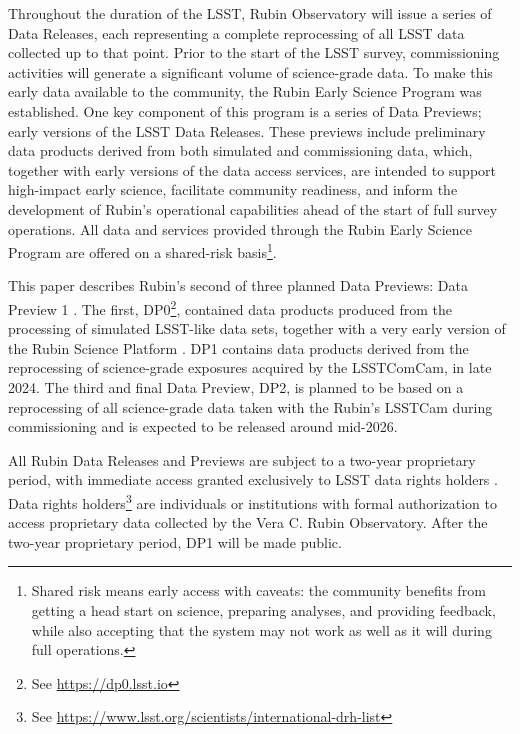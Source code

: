 Throughout the duration of the \gls{LSST},  Rubin Observatory will issue a series of Data Releases, each representing a complete reprocessing of all \gls{LSST} data collected up to that point.
Prior to the start of the \gls{LSST} survey, commissioning activities will generate a significant volume of science-grade data.
To make this early data available to the community, the  Rubin Early Science Program \citep{RTN-011}  was established.
One key component of this program is a series of Data Previews; early versions of the \gls{LSST} Data Releases.
These previews include preliminary data products derived from both simulated and commissioning data, which, together with early versions of the data access services, are intended to support high-impact early science, facilitate community readiness, and inform the development of Rubin’s operational capabilities ahead of the start of full survey operations.
All data and services provided through the Rubin Early Science Program are offered on a shared-risk basis\footnote{Shared risk means early access with caveats: the community benefits from getting a head start on science, preparing analyses, and providing feedback, while also accepting that the system may not work as well as it will during full operations.}.

This paper describes Rubin's second of three planned Data Previews:  Data Preview 1 \citep[DP1;][]{10.71929/rubin/2570308}.
The first, \gls{DP0}\footnote{See \url{https://dp0.lsst.io}}, contained data products produced from the processing of simulated \gls{LSST}-like data sets, together with a very early version of the 
Rubin Science Platform \citep[RSP;][]{LSE-319}.
\gls{DP1} contains data products derived from the reprocessing of science-grade exposures acquired by the \gls{LSSTComCam}, in late 2024.
The third and final Data Preview, \gls{DP2}, is planned to be based on a reprocessing of all science-grade data taken with the Rubin's \gls{LSSTCam} during commissioning and is expected to be released around mid-2026.

All Rubin Data Releases and Previews are subject to a two-year proprietary period, with immediate access granted exclusively to LSST data rights holders \citep{rdo-013}.
Data rights holders\footnote{See \url{https://www.lsst.org/scientists/international-drh-list}} are individuals or institutions with formal authorization to access proprietary data collected by the Vera C. Rubin Observatory.
After the two-year proprietary period, \gls{DP1} will be made public.

